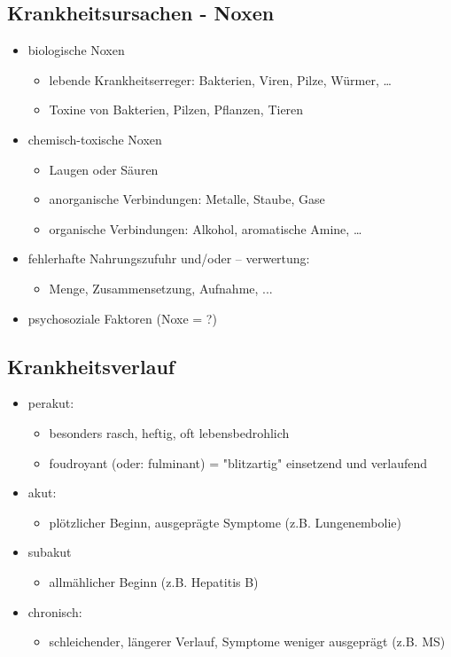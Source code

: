 \begin{it>emize}
\subsection{Krankheitsursachen - Noxen}
	\begin{itemize}
		\item biologische Noxen
			\begin{itemize}
				\item lebende Krankheitserreger: Bakterien, Viren, Pilze, Würmer, …
				\item Toxine von Bakterien, Pilzen, Pflanzen, Tieren
			\end{itemize}
		\item chemisch-toxische Noxen
			\begin{itemize}
				\item Laugen oder Säuren
				\item anorganische Verbindungen: Metalle, Staube, Gase
				\item organische Verbindungen: Alkohol, aromatische Amine, …
			\end{itemize}
		\item fehlerhafte Nahrungszufuhr und/oder – verwertung:
			\begin{itemize}
				\item Menge, Zusammensetzung, Aufnahme, ...
			\end{itemize}
		\item psychosoziale Faktoren (Noxe = ?)
	\end{itemize}

\subsection{Krankheitsverlauf}
	\begin{itemize}
		\item perakut:
			\begin{itemize}
				\item besonders rasch, heftig, oft lebensbedrohlich
				\item foudroyant (oder: fulminant) = "blitzartig" einsetzend und verlaufend
			\end{itemize}
		\item akut:
			\begin{itemize}
				\item plötzlicher Beginn, ausgeprägte Symptome (z.B. Lungenembolie)
			\end{itemize}
		\item subakut
			\begin{itemize}
				\item allmählicher Beginn (z.B. Hepatitis B)
			\end{itemize}
		\item chronisch:
			\begin{itemize}
				\item schleichender, längerer Verlauf, Symptome weniger ausgeprägt (z.B. MS)
			\end{itemize}
	\end{itemize}


\end{it>emize}
